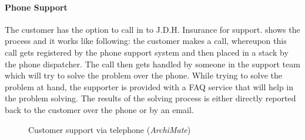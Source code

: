 \paragraph{Phone Support}
\label{sec:phone}
The customer has the option to call in to J.D.H. Insurance for support.  shows the process and it works like following: the customer makes a call, whereupon this call gets registered by the phone support system and then placed in a stack by the phone dispatcher. The call then gets handled by someone in the support team which will try to solve the problem over the phone. While trying to solve the problem at hand, the supporter is provided with a FAQ service that will help in the problem solving. The results of the solving process is either directly reported back to the customer over the phone or by an email. 
\begin{center}
	\begin{figure}[H]
		\centering
		\setlength\fboxsep{7pt}
		\setlength\fboxrule{0.5pt}
		\caption{Customer support via telephone (\emph{ArchiMate})}
		\label{fig:archi_phone}
	\end{figure}
\end{center}
%
